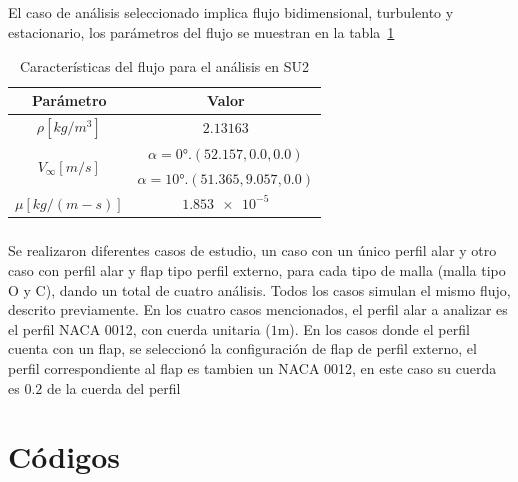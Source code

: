 \documentclass[letterpaper, openright, 12pt]{book}
\begin{document}
    \paragraph*{}
    El caso de análisis seleccionado implica flujo bidimensional, turbulento y
    estacionario, los parámetros del flujo se muestran en la
    tabla~\ref{SU2_simulation}
    \begin{table}[htbp!]
    \begin{center}
        \begin{tabular}{| c | c |}
        \hline
        Parámetro & Valor\\
        \hline
        $\rho[kg / m^3]$ &  $2.13163$\\
        \hline
        \multirow{2}{*}{$V_{\infty}[m / s]$} & $\alpha = \ang{0}.
        (52.157, 0.0, 0.0)$\\
        & $\alpha = \ang{10}. (51.365, 9.057, 0.0)$\\
        \hline
        $\mu[kg / (m-s)]$ &  $\num{1.853e-5}$\\
        \hline
        \end{tabular}
        \caption{Características del flujo para el análisis en SU2}
        \label{SU2_simulation}
    \end{center}
    \end{table}

    \paragraph*{}
    Se realizaron diferentes casos de estudio, un caso con un único perfil alar
    y otro caso con perfil alar y flap tipo perfil externo, para cada tipo de
    malla (malla tipo O y C), dando un total de cuatro análisis. Todos los
    casos simulan el mismo flujo, descrito previamente. En los cuatro casos
    mencionados, el perfil alar a analizar es el perfil NACA 0012, con cuerda
    unitaria ($1$m). En los casos donde el perfil cuenta con un flap, se
    seleccionó la configuración de flap de perfil externo, el perfil
    correspondiente al flap es tambien un NACA 0012, en este caso su cuerda es
    $0.2$ de la cuerda del perfil


%
%
%
%
%

%
%
%
%
%
\appendix
\chapter{Códigos}\label{appCode}

%
%
%
%
%
\end{document}
